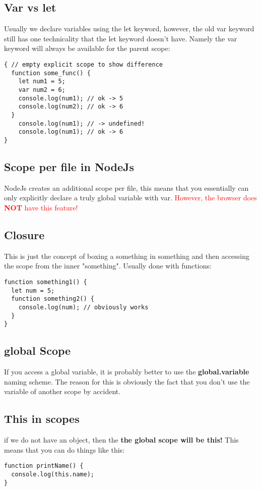 \documentclass[main.tex,fontsize=6pt,paper=a4,paper=landscape,DIV=calc,]{scrartcl}
\begin{document}
\begin{multicols*}{4}
\subsection{Var vs let}  
Usually we declare variables using the let keyword, however, the old var keyword still has one technicality that the let keyword doesn't have. Namely the var keyword will always be available for the parent scope:
\vspace{-2mm}
\begin{lstlisting}
{ // empty explicit scope to show difference
  function some_func() {
    let num1 = 5;
    var num2 = 6;
    console.log(num1); // ok -> 5
    console.log(num2); // ok -> 6
  }
    console.log(num1); // -> undefined!
    console.log(num1); // ok -> 6
}
\end{lstlisting}
\vspace{2mm}

\subsection{Scope per file in NodeJs} 
NodeJs creates an additional scope per file, this means that you essentially can only explicitly declare a truly global variable with var.\newline
\textcolor{red}{However, the browser does \textbf{NOT} have this feature!}

\subsection{Closure}  
This is just the concept of boxing a something in something and then accessing the scope from the inner "something". Usually done with functions:
\vspace{-2mm}
\begin{lstlisting}
function something1() {
  let num = 5;
  function something2() {
    console.log(num); // obviously works
  }
}
\end{lstlisting}
\vspace{2mm}

\subsection{global Scope}  
If you access a global variable, it is probably better to use the \textbf{global.variable} naming scheme. The reason for this is obviously the fact that you don't use the variable of another scope by accident.

\subsection{This in scopes}  
if we do not have an object, then the \textbf{the global scope will be this!}\newline
This means that you can do things like this:
\vspace{-2mm}
\begin{lstlisting}
function printName() {
  console.log(this.name);
}


\end{lstlisting}
\end{multicols*}
\end{document}
